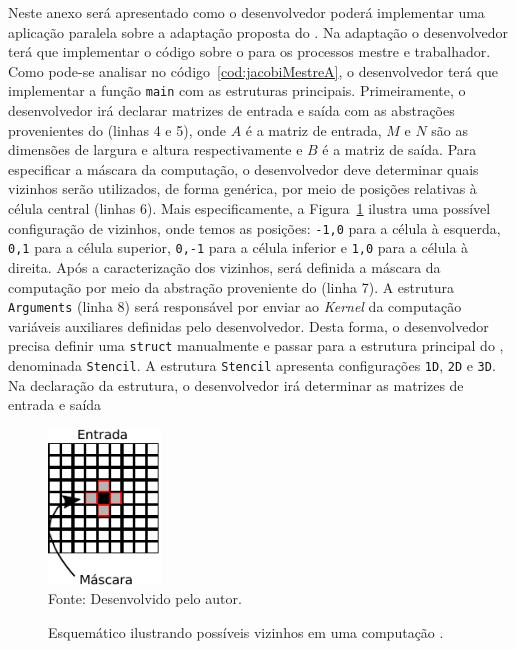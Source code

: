 Neste anexo será apresentado como o desenvolvedor poderá implementar uma
aplicação paralela sobre a adaptação proposta do \fw \pskel. Na adaptação o desenvolvedor
terá que implementar o código sobre o \fw \pskel para os processos mestre e
trabalhador. Como pode-se analisar no código~\ref{cod:jacobiMestreA}, o
desenvolvedor terá que implementar a função \texttt{main} com as estruturas
principais. Primeiramente, o desenvolvedor irá declarar matrizes de
entrada e saída com as abstrações provenientes do \fw (linhas 4 e 5), onde $A$ é
a matriz de entrada, $M$ e $N$ são as dimensões de largura e altura
respectivamente e $B$ é a matriz de saída. Para especificar a máscara da computação, o desenvolvedor deve determinar quais
vizinhos serão utilizados, de forma genérica, por meio de posições relativas à
célula central (linhas 6). Mais especificamente, a Figura~\ref{fig:stencilA} ilustra uma
possível configuração de vizinhos, onde temos as posições: \texttt{{-1,0}}
para a célula à esquerda, \texttt{{0,1}} para a célula superior,
\texttt{{0,-1}} para a célula inferior e \texttt{{1,0}} para a célula à
direita. Após a caracterização dos vizinhos, será definida a máscara da
computação por meio da abstração proveniente do \fw (linha 7). A estrutura
\texttt{Arguments} (linha 8) será responsável por enviar ao \textit{Kernel} da
computação variáveis auxiliares definidas pelo desenvolvedor. Desta forma, o
desenvolvedor precisa definir uma \texttt{struct} manualmente e passar para a estrutura
principal do \fw, denominada \texttt{Stencil}. A estrutura \texttt{Stencil}
apresenta configurações \texttt{1D}, \texttt{2D} e \texttt{3D}. Na declaração da
estrutura, o desenvolvedor irá determinar as matrizes de entrada e saída

\begin{figure}[!h]
    \centering
    \caption{Esquemático ilustrando possíveis vizinhos em uma computação \stencil.}
    \includegraphics[width=3cm]{figs/vizinhosAnexo.pdf} \\
    Fonte: Desenvolvido pelo autor.
    \label{fig:stencilA}
\end{figure}

